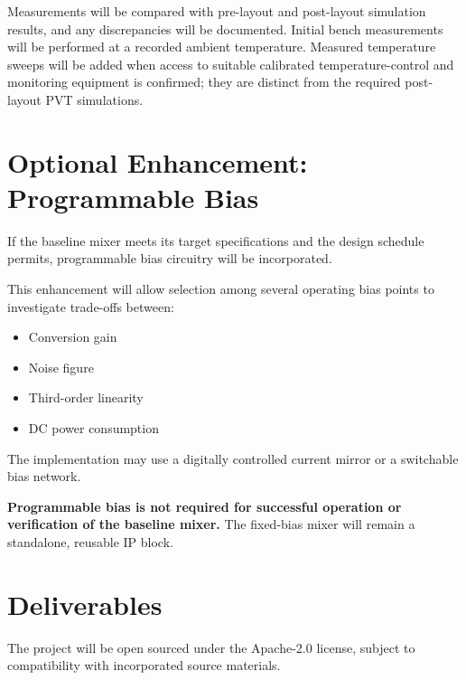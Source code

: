 \documentclass[11pt,letterpaper]{article}
\begin{document}
Measurements will be compared with pre-layout and post-layout simulation results, and any discrepancies will be documented.
Initial bench measurements will be performed at a recorded ambient temperature.
Measured temperature sweeps will be added when access to suitable calibrated temperature-control and monitoring equipment is confirmed; they are distinct from the required post-layout PVT simulations.


\section{Optional Enhancement: Programmable Bias}

If the baseline mixer meets its target specifications and the design schedule permits, programmable bias circuitry will be incorporated.

\begin{samepage}
This enhancement will allow selection among several operating bias points to investigate trade-offs between:

\begin{itemize}
    \item Conversion gain
    \item Noise figure
    \item Third-order linearity
    \item DC power consumption
\end{itemize}
\end{samepage}

The implementation may use a digitally controlled current mirror or a switchable bias network.

\textbf{Programmable bias is not required for successful operation or verification of the baseline mixer.} The fixed-bias mixer will remain a standalone, reusable IP block.


\section{Deliverables}

The project will be open sourced under the Apache-2.0 license, subject to compatibility with incorporated source materials.
\end{document}
